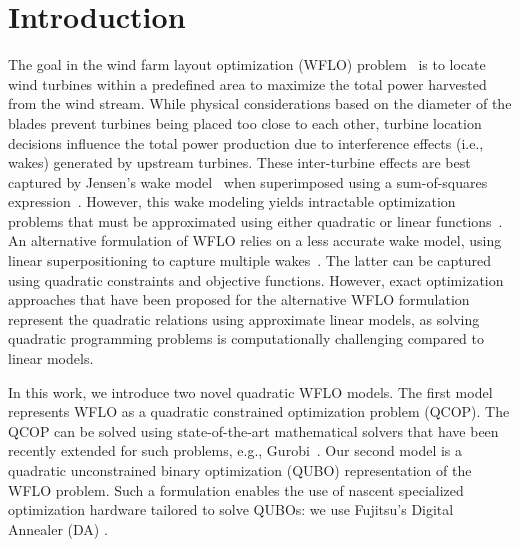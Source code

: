 \documentclass[preprint,12pt]{elsarticle}
\begin{document}
\maketitle 

\section{Introduction}
The goal in the wind farm layout optimization (WFLO)
problem~\cite{MOSETTI1994105} is to locate wind turbines within a
predefined area to maximize the total power harvested from the wind
stream.  While physical considerations based on the diameter of the
blades prevent turbines being placed too close to each other, turbine
location decisions influence the total power production due to
interference effects (i.e., wakes) generated by upstream turbines.
These inter-turbine effects are best captured by Jensen's wake model~\cite{jensen1983note} when superimposed
using a sum-of-squares expression~\cite{Zhang2014}. However,
this wake modeling yields intractable optimization problems
that must be approximated using either quadratic or linear functions~\cite{turner2014new}.
An alternative formulation of WFLO relies on a less accurate wake model, using linear superpositioning
to capture multiple wakes~\cite{donovan2005wind}.
The latter can be captured using quadratic
constraints and objective functions. However, exact optimization
approaches that have been proposed for the alternative WFLO formulation~\cite{Zhang2014,kuo2016wind,donovan2005wind,fagerfjall2010optimizing,archer2011wind,sorkhabi2018constrained}
represent the quadratic relations using approximate linear models,
as solving quadratic programming problems
is computationally challenging compared to linear models.

In this work, we introduce two novel quadratic WFLO models. The first
model represents WFLO as a quadratic constrained optimization
problem (QCOP).  The QCOP can be solved using state-of-the-art mathematical solvers
that have been recently extended for such problems, e.g., Gurobi~\cite{gurobi}.  Our
second model is a quadratic unconstrained binary optimization
(QUBO) representation of the WFLO problem.  Such a formulation enables the use of
nascent specialized optimization hardware tailored to solve QUBOs: we use Fujitsu's Digital Annealer (DA) \cite{aramon2019physics}.
\end{document}

